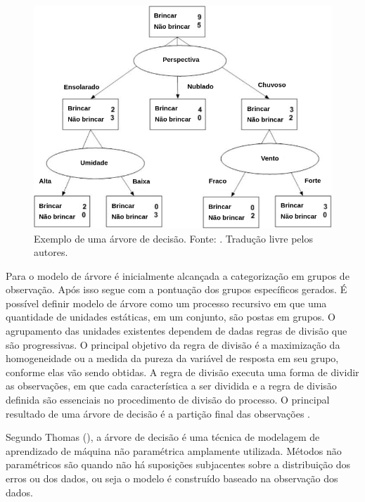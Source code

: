 \begin{figure}[H]
    \centering
    \includegraphics[scale=0.4]{figuras/referencial_teorico/arvore_decisao.png}
    \caption[Exemplo de uma árvore de decisão]{Exemplo de uma árvore de decisão. Fonte: \cite{Amal}. Tradução livre pelos autores.}
    \label{fig:arvore_decisao}
\end{figure}

Para o modelo de árvore é inicialmente alcançada a categorização em grupos de observação. Após isso segue com a pontuação dos grupos específicos gerados. É possível definir modelo de árvore como um processo recursivo em que uma quantidade de unidades estáticas, em um conjunto, são postas em grupos. O agrupamento das unidades existentes dependem de dadas regras de divisão que são progressivas. O principal objetivo da regra de divisão é a maximização da homogeneidade ou a medida da pureza da variável de resposta em seu grupo, conforme elas vão sendo obtidas. A regra de divisão executa uma forma de dividir as observações, em que cada característica a ser dividida e a regra de divisão definida são essenciais no procedimento de divisão do processo. O principal resultado de uma árvore de decisão é a partição final das observações \cite{Amal}. 

Segundo Thomas (\citeyear{Thomas:2017}), a árvore de decisão é uma técnica de modelagem de aprendizado de máquina não paramétrica amplamente utilizada. Métodos não paramétricos são quando não há suposições subjacentes sobre a distribuição dos erros ou dos dados, ou seja o modelo é construído baseado na observação dos dados.

